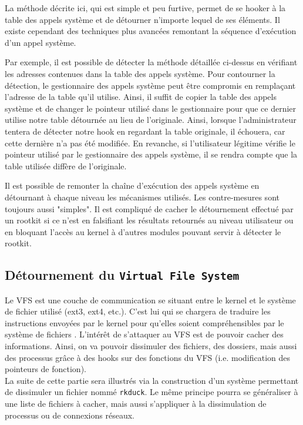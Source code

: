 \documentclass[12pt]{article}
\begin{document}
        La méthode décrite ici, qui est simple et peu furtive, permet de se hooker à la table des appels système et de détourner n'importe lequel de ses éléments. Il existe cependant des techniques plus avancées remontant la séquence d'exécution d'un appel système.

        Par exemple, il est possible de détecter la méthode détaillée ci-dessus en vérifiant les adresses contenues dans la table des appels système. Pour contourner la détection, le gestionnaire des appels système peut être compromis en remplaçant l'adresse de la table qu'il utilise. Ainsi, il suffit de copier la table des appels système et de changer le pointeur utilisé dans le gestionnaire pour que ce dernier utilise notre table détournée au lieu de l'originale. Ainsi, lorsque l'administrateur tentera de détecter notre hook en regardant la table originale, il échouera, car cette dernière n'a pas été modifiée. En revanche, si l'utilisateur légitime vérifie le pointeur utilisé par le gestionnaire des appels système, il se rendra compte que la table utilisée diffère de l'originale. 
        
        Il est possible de remonter la chaîne d'exécution des appels système en détournant à chaque niveau les mécanismes utilisés. Les contre-mesures sont toujours aussi "simples". Il est compliqué de cacher le détournement effectué par un rootkit si ce n'est en falsifiant les résultats retournés au niveau utilisateur ou en bloquant l'accès au kernel à d'autres modules pouvant servir à détecter le rootkit.

    \subsection{Détournement du \texttt{Virtual File System}}
    \label{sec:vfs}
    
        Le VFS est une couche de communication se situant entre le kernel et le système de fichier utilisé (ext3, ext4, etc.). C'est lui qui se chargera de traduire les instructions envoyées par le kernel pour qu'elles soient compréhensibles par le système de fichiers \cite{VFS}.
        L'intérêt de s'attaquer au VFS est de pouvoir cacher des informations. Ainsi, on va pouvoir dissimuler des fichiers, des dossiers, mais aussi des processus grâce à des hooks sur des fonctions du VFS (i.e. modification des pointeurs de fonction). \\

        La suite de cette partie sera illustrés via la construction d'un système permettant de dissimuler un fichier nommé \texttt{rkduck}. Le même principe pourra se généraliser à une liste de fichiers à cacher, mais aussi s'appliquer à la dissimulation de processus ou de connexions réseaux. 
\end{document}
